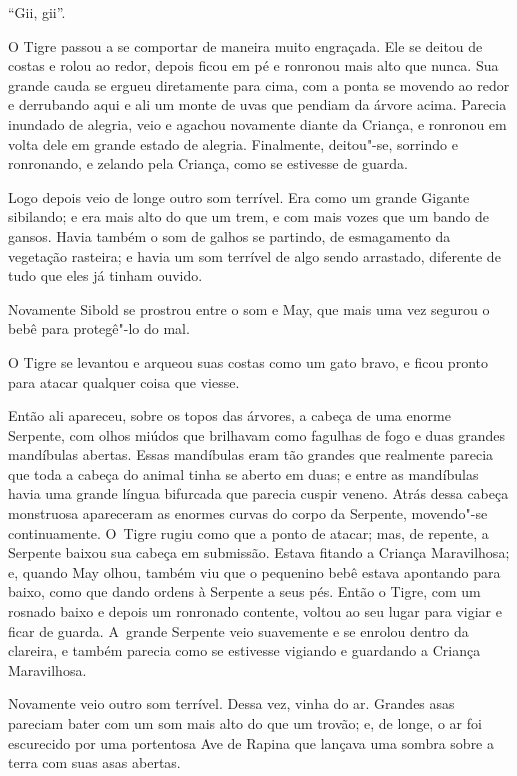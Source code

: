 ``Gii, gii''.

O Tigre passou a se comportar de maneira muito engraçada. Ele se deitou
de costas e rolou ao redor, depois ficou em pé e ronronou mais alto que
nunca. Sua grande cauda se ergueu diretamente para cima, com a ponta se
movendo ao redor e derrubando aqui e ali um monte de uvas que pendiam da
árvore acima. Parecia inundado de alegria, veio e agachou novamente
diante da Criança, e ronronou em volta dele em grande estado de alegria.
Finalmente, deitou"-se, sorrindo e ronronando, e zelando pela Criança,
como se estivesse de guarda.

Logo depois veio de longe outro som terrível. Era como um grande Gigante
sibilando; e era mais alto do que um trem, e com mais vozes que um bando
de gansos. Havia também o som de galhos se partindo, de esmagamento da
vegetação rasteira; e havia um som terrível de algo sendo arrastado,
diferente de tudo que eles já tinham ouvido.

Novamente Sibold se prostrou entre o som e May, que mais uma vez segurou
o bebê para protegê"-lo do mal.

O Tigre se levantou e arqueou suas costas como um gato bravo, e ficou
pronto para atacar qualquer coisa que viesse.

Então ali apareceu, sobre os topos das árvores, a cabeça de uma enorme
Serpente, com olhos miúdos que brilhavam como fagulhas de fogo e duas
grandes mandíbulas abertas. Essas mandíbulas eram tão grandes que
realmente parecia que toda a cabeça do animal tinha se aberto em duas; e
entre as mandíbulas havia uma grande língua bifurcada que parecia cuspir
veneno. Atrás dessa cabeça monstruosa apareceram as enormes curvas do
corpo da Serpente, movendo"-se continuamente. O~Tigre rugiu como que a
ponto de atacar; mas, de repente, a Serpente baixou sua cabeça em
submissão. Estava fitando a Criança Maravilhosa; e, quando May olhou,
também viu que o pequenino bebê estava apontando para baixo, como que
dando ordens à Serpente a seus pés. Então o Tigre, com um rosnado baixo
e depois um ronronado contente, voltou ao seu lugar para vigiar e ficar
de guarda. A~grande Serpente veio suavemente e se enrolou dentro da
clareira, e também parecia como se estivesse vigiando e guardando a
Criança Maravilhosa.

Novamente veio outro som terrível. Dessa vez, vinha do ar. Grandes asas
pareciam bater com um som mais alto do que um trovão; e, de longe, o ar
foi escurecido por uma portentosa Ave de Rapina que lançava uma sombra
sobre a terra com suas asas abertas.

